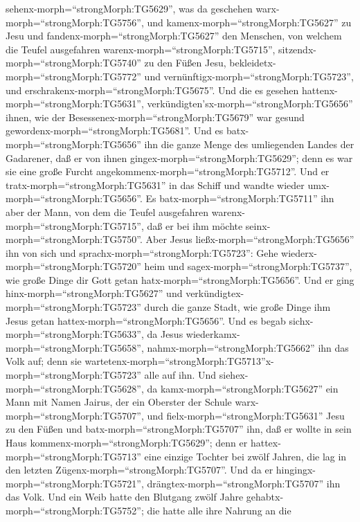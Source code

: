 sehenx-morph=``strongMorph:TG5629'', was da geschehen
warx-morph=``strongMorph:TG5756'', und
kamenx-morph=``strongMorph:TG5627'' zu Jesu und
fandenx-morph=``strongMorph:TG5627'' den Menschen, von welchem die
Teufel ausgefahren warenx-morph=``strongMorph:TG5715'',
sitzendx-morph=``strongMorph:TG5740'' zu den Füßen Jesu,
bekleidetx-morph=``strongMorph:TG5772'' und
vernünftigx-morph=``strongMorph:TG5723'', und
erschrakenx-morph=``strongMorph:TG5675''.  Und die es
gesehen hattenx-morph=``strongMorph:TG5631'',
verkündigten'sx-morph=``strongMorph:TG5656'' ihnen, wie der
Besessenex-morph=``strongMorph:TG5679'' war gesund
gewordenx-morph=``strongMorph:TG5681''.  Und es
batx-morph=``strongMorph:TG5656'' ihn die ganze Menge des umliegenden
Landes der Gadarener, daß er von ihnen
gingex-morph=``strongMorph:TG5629''; denn es war sie eine große Furcht
angekommenx-morph=``strongMorph:TG5712''. Und er
tratx-morph=``strongMorph:TG5631'' in das Schiff und wandte wieder
umx-morph=``strongMorph:TG5656''.  Es
batx-morph=``strongMorph:TG5711'' ihn aber der Mann, von dem die Teufel
ausgefahren warenx-morph=``strongMorph:TG5715'', daß er bei ihm möchte
seinx-morph=``strongMorph:TG5750''. Aber Jesus
ließx-morph=``strongMorph:TG5656'' ihn von sich und
sprachx-morph=``strongMorph:TG5723'':  Gehe
wiederx-morph=``strongMorph:TG5720'' heim und
sagex-morph=``strongMorph:TG5737'', wie große Dinge dir Gott getan
hatx-morph=``strongMorph:TG5656''. Und er ging
hinx-morph=``strongMorph:TG5627'' und
verkündigtex-morph=``strongMorph:TG5723'' durch die ganze Stadt, wie
große Dinge ihm Jesus getan hattex-morph=``strongMorph:TG5656''.
 Und es begab sichx-morph=``strongMorph:TG5633'', da Jesus
wiederkamx-morph=``strongMorph:TG5658'',
nahmx-morph=``strongMorph:TG5662'' ihn das Volk auf; denn sie
wartetenx-morph=``strongMorph:TG5713''x-morph=``strongMorph:TG5723''
alle auf ihn.  Und siehex-morph=``strongMorph:TG5628'', da
kamx-morph=``strongMorph:TG5627'' ein Mann mit Namen Jairus, der ein
Oberster der Schule warx-morph=``strongMorph:TG5707'', und
fielx-morph=``strongMorph:TG5631'' Jesu zu den Füßen und
batx-morph=``strongMorph:TG5707'' ihn, daß er wollte in sein Haus
kommenx-morph=``strongMorph:TG5629'';  denn er
hattex-morph=``strongMorph:TG5713'' eine einzige Tochter bei zwölf
Jahren, die lag in den letzten Zügenx-morph=``strongMorph:TG5707''. Und
da er hingingx-morph=``strongMorph:TG5721'',
drängtex-morph=``strongMorph:TG5707'' ihn das Volk.  Und
ein Weib hatte den Blutgang zwölf Jahre
gehabtx-morph=``strongMorph:TG5752''; die hatte alle ihre Nahrung an die
